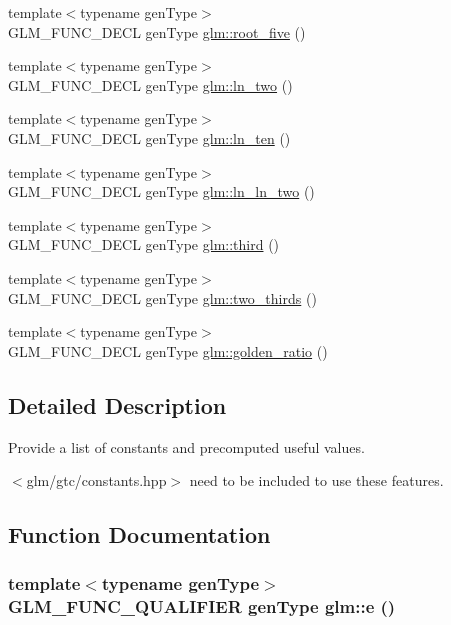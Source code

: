 \begin{CompactItemize}
{\footnotesize template$<$typename genType$>$ }\\GLM\_\-FUNC\_\-DECL genType \hyperlink{group__gtc__constants_gfa2f8c1bc0e6684652171820d9140d3e}{glm::root\_\-five} ()
\item 
{\footnotesize template$<$typename genType$>$ }\\GLM\_\-FUNC\_\-DECL genType \hyperlink{group__gtc__constants_g1d237e2d94b69cdf1122ae8cbb561b2d}{glm::ln\_\-two} ()
\item 
{\footnotesize template$<$typename genType$>$ }\\GLM\_\-FUNC\_\-DECL genType \hyperlink{group__gtc__constants_g8b4f9e44073d823e00294592d295d0f1}{glm::ln\_\-ten} ()
\item 
{\footnotesize template$<$typename genType$>$ }\\GLM\_\-FUNC\_\-DECL genType \hyperlink{group__gtc__constants_g938ac709f33297c1324ca30866f3d9a5}{glm::ln\_\-ln\_\-two} ()
\item 
{\footnotesize template$<$typename genType$>$ }\\GLM\_\-FUNC\_\-DECL genType \hyperlink{group__gtc__constants_ge45f6bc38af321ae365cf702a527c574}{glm::third} ()
\item 
{\footnotesize template$<$typename genType$>$ }\\GLM\_\-FUNC\_\-DECL genType \hyperlink{group__gtc__constants_g846874e34295fed917708f134f754ae4}{glm::two\_\-thirds} ()
\item 
{\footnotesize template$<$typename genType$>$ }\\GLM\_\-FUNC\_\-DECL genType \hyperlink{group__gtc__constants_g8a045109452784d20481cd2ac053c4e0}{glm::golden\_\-ratio} ()
\end{CompactItemize}


\subsection{Detailed Description}
Provide a list of constants and precomputed useful values. 

$<$glm/gtc/constants.hpp$>$ need to be included to use these features. 

\subsection{Function Documentation}
\hypertarget{group__gtc__constants_g2425b9c6a54d9d91fd1a634700e85cf1}{
\subsubsection[e]{\setlength{\rightskip}{0pt plus 5cm}template$<$typename genType$>$ GLM\_\-FUNC\_\-QUALIFIER genType glm::e ()}}
\label{group__gtc__constants_g2425b9c6a54d9d91fd1a634700e85cf1}


